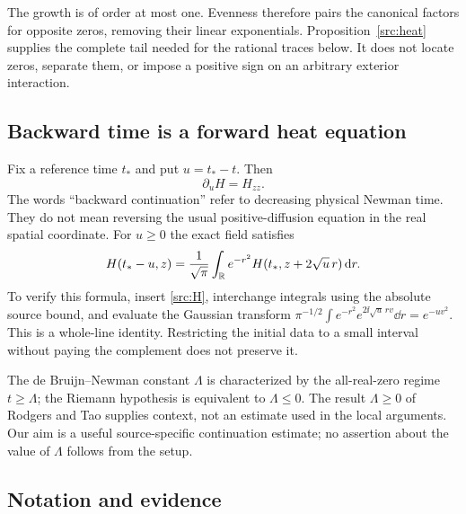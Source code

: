 The growth is of order at most one. Evenness therefore pairs the
canonical factors for opposite zeros, removing their linear
exponentials. Proposition~\ref{src:heat} supplies the complete tail
needed for the rational traces below. It does not locate zeros,
separate them, or impose a positive sign on an arbitrary exterior
interaction.

\subsection{Backward time is a forward heat equation}

Fix a reference time $t_*$ and put $u=t_*-t$. Then
\begin{equation}
 \partial_u H=H_{zz}.
 \label{src:backward}
\end{equation}
The words ``backward continuation'' refer to decreasing physical Newman
time. They do not mean reversing the usual positive-diffusion equation
in the real spatial coordinate. For $u\ge0$ the exact field satisfies
\begin{equation}
 H(t_*-u,z)=\frac1{\sqrt\pi}\int_{\mathbb R}
 e^{-r^2}H(t_*,z+2\sqrt u\,r)\,\mathrm d r.
 \label{src:gaussian}
\end{equation}
To verify this formula, insert \eqref{src:H}, interchange integrals
using the absolute source bound, and evaluate the Gaussian transform
$\pi^{-1/2}\int e^{-r^2}e^{2\ii\sqrt u\,rv}\dd r=e^{-uv^2}$.
This is a whole-line identity. Restricting the initial data to a small
interval without paying the complement does not preserve it.

The de Bruijn--Newman constant $\Lambda$ is characterized by the
all-real-zero regime $t\ge\Lambda$; the Riemann hypothesis is equivalent
to $\Lambda\le0$. The result $\Lambda\ge0$ of Rodgers and Tao
\cite{RodgersTao2020} supplies context, not an estimate used in the local
arguments. Our aim is a useful source-specific continuation estimate;
no assertion about the value of $\Lambda$ follows from the setup.

\subsection{Notation and evidence}

